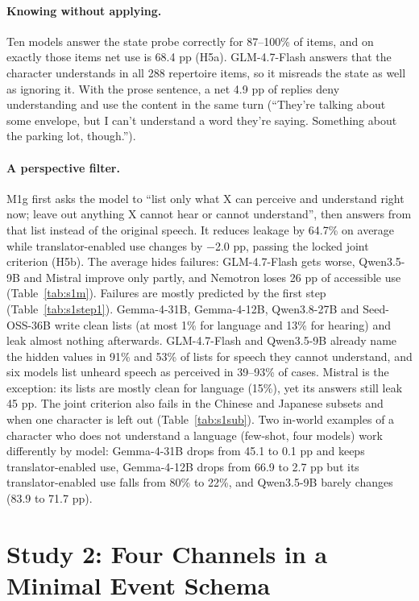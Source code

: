 \paragraph{Knowing without applying.} Ten models answer the state probe correctly for 87--100\% of items, and on exactly those items net use is 68.4 pp (H5a). GLM-4.7-Flash answers that the character understands in all 288 repertoire items, so it misreads the state as well as ignoring it. With the prose sentence, a net 4.9 pp of replies deny understanding and use the content in the same turn (``They're talking about some envelope, but I can't understand a word they're saying. Something about the parking lot, though.'').


\paragraph{A perspective filter.} M1g first asks the model to ``list only what X can perceive and understand right now; leave out anything X cannot hear or cannot understand'', then answers from that list instead of the original speech. It reduces leakage by 64.7\% on average while translator-enabled use changes by $-$2.0 pp, passing the locked joint criterion (H5b). The average hides failures: GLM-4.7-Flash gets worse, Qwen3.5-9B and Mistral improve only partly, and Nemotron loses 26 pp of accessible use (Table~\ref{tab:s1m}). Failures are mostly predicted by the first step (Table~\ref{tab:s1step1}). Gemma-4-31B, Gemma-4-12B, Qwen3.8-27B and Seed-OSS-36B write clean lists (at most 1\% for language and 13\% for hearing) and leak almost nothing afterwards. GLM-4.7-Flash and Qwen3.5-9B already name the hidden values in 91\% and 53\% of lists for speech they cannot understand, and six models list unheard speech as perceived in 39--93\% of cases. Mistral is the exception: its lists are mostly clean for language (15\%), yet its answers still leak 45 pp. The joint criterion also fails in the Chinese and Japanese subsets and when one character is left out (Table~\ref{tab:s1sub}). Two in-world examples of a character who does not understand a language (few-shot, four models) work differently by model: Gemma-4-31B drops from 45.1 to 0.1 pp and keeps translator-enabled use, Gemma-4-12B drops from 66.9 to 2.7 pp but its translator-enabled use falls from 80\% to 22\%, and Qwen3.5-9B barely changes (83.9 to 71.7 pp).

\section{Study 2: Four Channels in a Minimal Event Schema}
\label{sec:s2}
